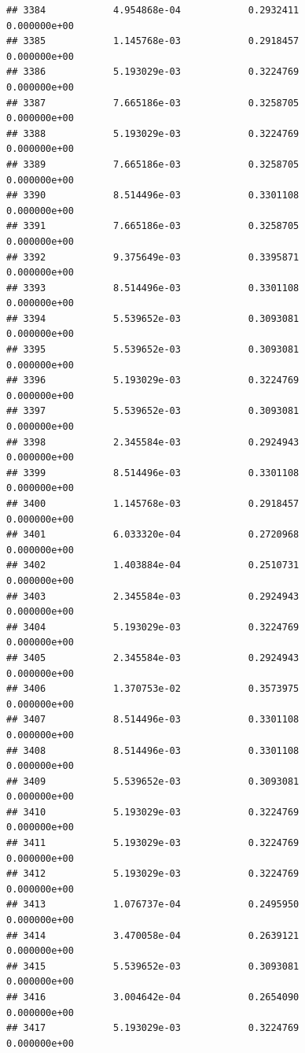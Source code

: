 \documentclass[
]{article}
\begin{document}
\begin{verbatim}
## 3384            4.954868e-04            0.2932411            0.000000e+00
## 3385            1.145768e-03            0.2918457            0.000000e+00
## 3386            5.193029e-03            0.3224769            0.000000e+00
## 3387            7.665186e-03            0.3258705            0.000000e+00
## 3388            5.193029e-03            0.3224769            0.000000e+00
## 3389            7.665186e-03            0.3258705            0.000000e+00
## 3390            8.514496e-03            0.3301108            0.000000e+00
## 3391            7.665186e-03            0.3258705            0.000000e+00
## 3392            9.375649e-03            0.3395871            0.000000e+00
## 3393            8.514496e-03            0.3301108            0.000000e+00
## 3394            5.539652e-03            0.3093081            0.000000e+00
## 3395            5.539652e-03            0.3093081            0.000000e+00
## 3396            5.193029e-03            0.3224769            0.000000e+00
## 3397            5.539652e-03            0.3093081            0.000000e+00
## 3398            2.345584e-03            0.2924943            0.000000e+00
## 3399            8.514496e-03            0.3301108            0.000000e+00
## 3400            1.145768e-03            0.2918457            0.000000e+00
## 3401            6.033320e-04            0.2720968            0.000000e+00
## 3402            1.403884e-04            0.2510731            0.000000e+00
## 3403            2.345584e-03            0.2924943            0.000000e+00
## 3404            5.193029e-03            0.3224769            0.000000e+00
## 3405            2.345584e-03            0.2924943            0.000000e+00
## 3406            1.370753e-02            0.3573975            0.000000e+00
## 3407            8.514496e-03            0.3301108            0.000000e+00
## 3408            8.514496e-03            0.3301108            0.000000e+00
## 3409            5.539652e-03            0.3093081            0.000000e+00
## 3410            5.193029e-03            0.3224769            0.000000e+00
## 3411            5.193029e-03            0.3224769            0.000000e+00
## 3412            5.193029e-03            0.3224769            0.000000e+00
## 3413            1.076737e-04            0.2495950            0.000000e+00
## 3414            3.470058e-04            0.2639121            0.000000e+00
## 3415            5.539652e-03            0.3093081            0.000000e+00
## 3416            3.004642e-04            0.2654090            0.000000e+00
## 3417            5.193029e-03            0.3224769            0.000000e+00

\end{verbatim}
\end{document}
